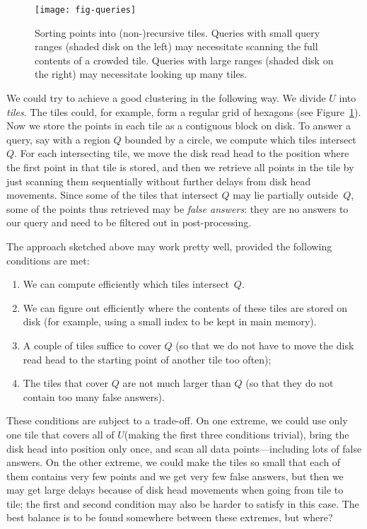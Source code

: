 \documentclass[11pt,a4paper]{article}
\newcommand{\unittile}{\ensuremath{U}\xspace}
\begin{document}
\begin{figure}
\centering
\texttt{[image: fig-queries]}
\caption{Sorting points into (non-)recursive tiles. Queries with small query ranges (shaded disk on the left) may necessitate scanning the full contents of a crowded tile. Queries with large ranges (shaded disk on the right) may necessitate looking up many tiles.}
\label{fig:queries}
\end{figure}

We could try to achieve a good clustering in the following way. We divide \unittile into \emph{tiles}. The tiles could, for example, form a regular grid of hexagons (see Figure~\ref{fig:queries}). Now we store the points in each tile as a contiguous block on disk. To answer a query, say with a region $Q$ bounded by a circle, we compute which tiles intersect~$Q$. For each intersecting tile, we move the disk read head to the position where the first point in that tile is stored, and then we retrieve all points in the tile by just scanning them sequentially without further delays from disk head movements. Since some of the tiles that intersect $Q$ may lie partially outside~$Q$, some of the points thus retrieved may be \emph{false answers}: they are no answers to our query and need to be filtered out in post-processing.

The approach sketched above may work pretty well, provided the following conditions are met:\begin{enumerate}
\item We can compute efficiently which tiles intersect~$Q$.
\item We can figure out efficiently where the contents of these tiles are stored on disk (for example, using a small index to be kept in main memory).
\item A couple of tiles suffice to cover $Q$ (so that we do not have to move the disk read head to the starting point of another tile too often);
\item The tiles that cover $Q$ are not much larger than $Q$ (so that they do not contain too many false answers).
\end{enumerate}
These conditions are subject to a trade-off. On one extreme, we could use only one tile that covers all of \unittile (making the first three conditions trivial), bring the disk head into position only once, and scan all data points---including lots of false answers. On the other extreme, we could make the tiles so small that each of them contains very few points and we get very few false answers, but then we may get large delays because of disk head movements when going from tile to tile; the first and second condition may also be harder to satisfy in this case. The best balance is to be found somewhere between these extremes, but where?
\end{document}
